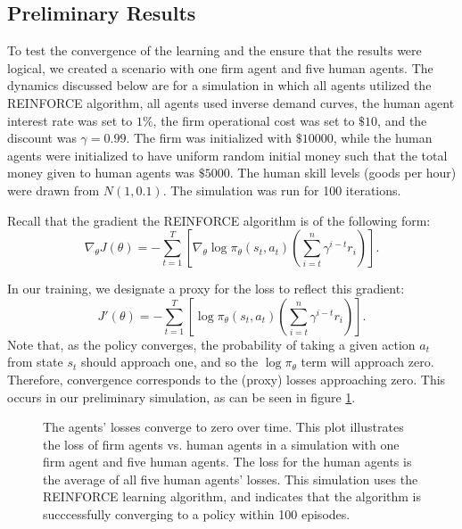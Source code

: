 \documentclass[twoside,twocolumn]{article}
\begin{document}
\subsection{Preliminary Results}

To test the convergence of the learning and the ensure that the results were logical, we created a scenario with one firm agent and five human agents. The dynamics discussed below are for a simulation in which all agents utilized the REINFORCE algorithm, all agents used inverse demand curves, the human agent interest rate was set to $1\%$, the firm operational cost was set to $\$10$, and the discount was $\gamma = 0.99$. The firm was initialized with $\$10000$, while the human agents were initialized to have uniform random initial money such that the total money given to human agents was $\$5000$. The human skill levels (goods per hour) were drawn from $N(1, 0.1)$. The simulation was run for 100 iterations. 

\medskip 

Recall that the gradient the REINFORCE algorithm is of the following form:
\[
  \nabla_{\theta} J(\theta) = -\sum_{t = 1}^T \left[\nabla_{\theta} \log \pi_\theta(s_t, a_t) \left( \sum_{i = t}^n \gamma^{i - t}r_i \right) \right].  
\]

In our training, we designate a proxy for the loss to reflect this gradient:
\[
  J'(\theta) = -\sum_{t = 1}^T \left[\log \pi_\theta(s_t, a_t) \left( \sum_{i = t}^n \gamma^{i - t}r_i \right) \right].  
\]
Note that, as the policy converges, the probability of taking a given action $a_t$ from state $s_t$ should approach one, and so the $\log \pi_\theta$ term will approach zero. Therefore, convergence corresponds to the (proxy) losses approaching zero. This occurs in our preliminary simulation, as can be seen in figure \ref{plt:losstozero}.

\begin{figure}[h]
\caption{The agents' losses converge to zero over time. This plot illustrates the loss of firm agents vs. human agents in a simulation with one firm agent and five human agents. The loss for the human agents is the average of all five human agents' losses. This simulation uses the REINFORCE learning algorithm, and indicates that the algorithm is succcessfully converging to a policy within 100 episodes.}
\label{plt:losstozero}
\end{figure}
\end{document}
